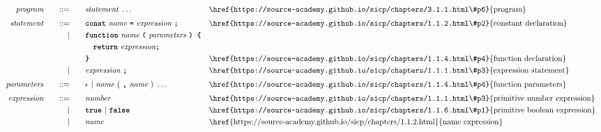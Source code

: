 \begin{alignat*}{9}
&& \textit{program}    &&\quad ::= &\quad && \textit{statement} \ \ldots
                                                           && \textrm{\href{https://source-academy.github.io/sicp/chapters/3.1.1.html\#p6}{program}} \\[1mm]
&& \textit{statement}    &&\quad ::= &\quad && \textbf{\texttt{const}}\  \textit{name} \ 
                                           \textbf{\texttt{=}}\  \textit{expression} \ \textbf{\texttt{;}}
                                                           && \textrm{\href{https://source-academy.github.io/sicp/chapters/1.1.2.html\#p2}{constant declaration}} \\
&&                       && |   &\quad && \textbf{\texttt{function}}\  \textit{name} \ 
                                          \textbf{\texttt{(}}\  \textit{parameters} \ \textbf{\texttt{) \{}}\\
 &&                       &&     &      && \ \ \  \textbf{\texttt{return}}\ \textit{expression}\textbf{\texttt{;}} \\
&&                       &&     &      && \textbf{\texttt{\}}} && \textrm{\href{https://source-academy.github.io/sicp/chapters/1.1.4.html\#p4}{function declaration}}\\
&&                       && |   &\quad &&  \textit{expression} \ \textbf{\texttt{;}}
                                                           && \textrm{\href{https://source-academy.github.io/sicp/chapters/1.1.1.html\#p3}{expression statement}} \\[1mm]
&& \textit{parameters}   && ::= &\quad &&  \epsilon\ | \  \textit{name} \ 
                                                   (\ \textbf{\texttt{,}} \ \textit{name}\ )\ \ldots
                                                            && \textrm{\href{https://source-academy.github.io/sicp/chapters/1.1.4.html\#p4}{function parameters}}   \\[1mm]
&& \textit{expression}   && ::= &\quad &&  \textit{number}   && \textrm{\href{https://source-academy.github.io/sicp/chapters/1.1.1.html\#p3}{primitive number expression}}\\
&&                       && |   &\quad && \textbf{\texttt{true}}\ |\ \textbf{\texttt{false}}
                                                           && \textrm{\href{https://source-academy.github.io/sicp/chapters/1.1.6.html\#p1}{primitive boolean expression}}\\
&&                       && |   &\quad &&  \textit{name}   && \textrm{\href{https://source-academy.github.io/sicp/chapters/1.1.2.html}{name expression}}\\

\end{alignat*}
